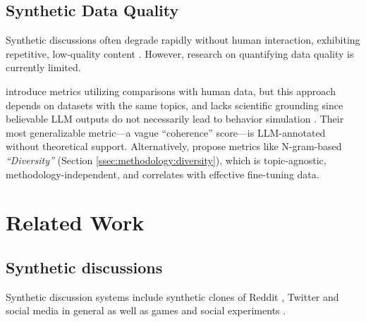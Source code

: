 \subsection{Synthetic Data Quality}
\label{ssec:related:quality}

Synthetic discussions often degrade rapidly without human interaction, exhibiting repetitive, low-quality content \citep{ulmer2024}. 
However, research on quantifying data quality is currently limited.

\citet{balog_2024} introduce metrics utilizing comparisons with human data, but this approach depends on datasets with the same topics, and lacks scientific grounding since believable \ac{LLM} outputs do not necessarily lead to behavior simulation \cite{rossi_2024}. Their most generalizable metric—a vague “coherence” score—is \ac{LLM}-annotated without theoretical support. Alternatively, \citet{ulmer2024} propose metrics like N-gram-based \textit{“Diversity”} (Section \ref{ssec:methodology:diversity}), which is topic-agnostic, methodology-independent, and correlates with effective fine-tuning data.


\section{Related Work}

\subsection{Synthetic discussions}
\label{ssec:related:discussions}


Synthetic discussion systems 
include synthetic clones of Reddit \cite{park_simulacra}, Twitter \cite{mou_2024} and social media in general \cite{tornberg_2023, y_social} as well as games \cite{Park2023GenerativeAI} and social experiments \cite{zhou_2024_sotopia}.

